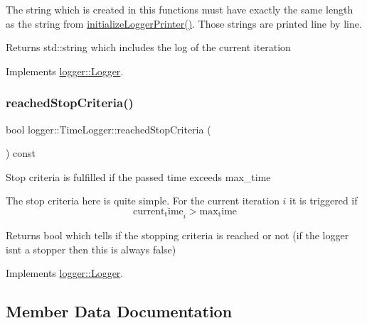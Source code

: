 The string which is created in this functions must have exactly the same length as the string from {\ttfamily \mbox{\hyperlink{classlogger_1_1_time_logger_a60f041a21157b1049f512d325c3d35ac}{initialize\+Logger\+Printer()}}}. Those strings are printed line by line.

\begin{DoxyReturn}{Returns}
{\ttfamily std\+::string} which includes the log of the current iteration 
\end{DoxyReturn}


Implements \mbox{\hyperlink{classlogger_1_1_logger_abad818a7e8053ca84cb267e883b5e377}{logger\+::\+Logger}}.

\mbox{\label{classlogger_1_1_time_logger_a380f7e56af17c8a35d729dad1a5e3baa}} 
\subsubsection{\texorpdfstring{reached\+Stop\+Criteria()}{reachedStopCriteria()}}
{\footnotesize\ttfamily bool logger\+::\+Time\+Logger\+::reached\+Stop\+Criteria (\begin{DoxyParamCaption}{ }\end{DoxyParamCaption}) const\hspace{0.3cm}{\ttfamily [virtual]}}



Stop criteria is fulfilled if the passed time exceeds {\ttfamily max\+\_\+time} 

The stop criteria here is quite simple. For the current iteration $i$ it is triggered if \[ \mathrm{current_time}_i > \mathrm{max_time} \]

\begin{DoxyReturn}{Returns}
{\ttfamily bool} which tells if the stopping criteria is reached or not (if the logger isn\textquotesingle{}t a stopper then this is always false) 
\end{DoxyReturn}


Implements \mbox{\hyperlink{classlogger_1_1_logger_aed91421c07062b91cee158ef2bda7ae8}{logger\+::\+Logger}}.



\subsection{Member Data Documentation}
\mbox{\label{classlogger_1_1_time_logger_a57bbc70bcc5e0fb1b1a62d49af30bf3b}} 
